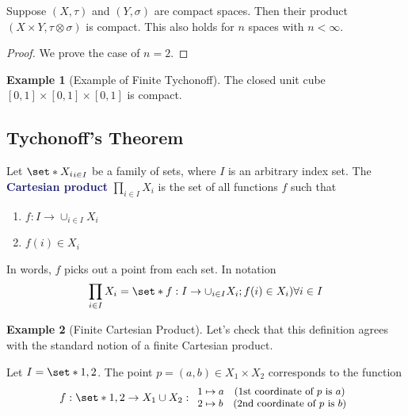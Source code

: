 \documentclass[11pt]{article}
\numberwithin{equation}{section}
\newcommand{\navy}[1]{\textcolor{MidnightBlue}{\bf #1}}
\newcounter{theo}[section]\setcounter{theo}{0}
\theoremstyle{definition}
\theoremstyle{definition}
\newtheorem{example}{\color{WildStrawberry}Example}[section]
\def\Set{\set*}%
\newcommand{\1}{\mathbbm 1}
\def\t{\tau}
\begin{document}
\begin{theorem}
	Suppose $(X,\t)$ and $(Y,\sigma)$ are compact spaces. Then their product $(X\times Y, \t \otimes \sigma)$ is compact. This also holds for $n$ spaces with $n < \infty$. 
\end{theorem}
\begin{proof}
	We prove the case of $n=2$.
\end{proof}

\begin{example}[Example of Finite Tychonoff]
	The closed unit cube $[0,1]\times[0,1] \times [0,1]$ is compact. 
\end{example}

\subsection{Tychonoff's Theorem}

\begin{definition}
	Let $\Set{X_i}_{i\in I}$ be a family of sets, where $I$ is an arbitrary index set. The \navy{Cartesian product} $\prod_{i \in I} X_i$ is the set of all functions $f$ such that
	\begin{enumerate}
		\item $f: I \to \cup_{i \in I} X_i$ 
		\item $f(i) \in X_i$
	\end{enumerate}
	In words, $f$ picks out a point from each set. In notation
	\begin{equation}
		\prod_{i \in I} X_i = \Set{f: I \to \cup_{i \in I} X_i; f(i) \in X_i) \forall i \in I}
	\end{equation}
\end{definition}


\begin{example}[Finite Cartesian Product]
	Let's check that this definition agrees with the standard notion of a finite Cartesian product. 

	Let $I = \Set{1,2}$. The point $p = (a,b) \in X_1 \times X_2$ corresponds to the function
	\begin{equation}
		f: \Set{1,2} \to X_1 \cup X_2 : 
		\small
		\begin{array}{l}
		1 \mapsto a \quad \text{(1st coordinate of $p$ is $a$)}\\
		2 \mapsto b \quad \text{(2nd coordinate of $p$ is $b$)}\\
		\end{array}
		\normalsize
	\end{equation}
\end{example}
\end{document}
